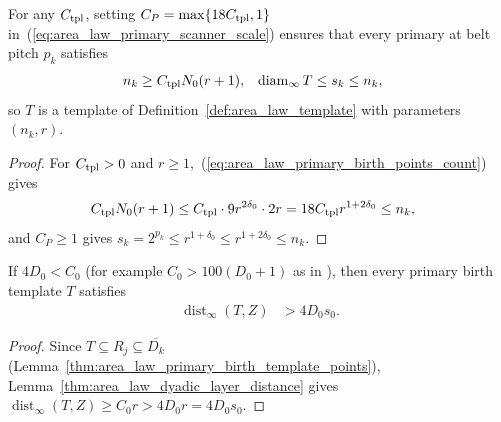 \begin{lemma}
    \label{thm:area_law_primary_scanner_constant}
    \leanok
    For any $C_{\rm tpl}$, setting $C_P=\max\{18C_{\rm tpl},1\}$ in~(\ref{eq:area_law_primary_scanner_scale})
    ensures that every primary at belt pitch $p_k$ satisfies
    \begin{align}
        n_k                          & \ge C_{\rm tpl}N_0(r+1), &
        \operatorname{diam}_\infty T & \le s_k\le n_k,
        \label{eq:area_law_primary_scanner_constant}
    \end{align}
    so $T$ is a template of Definition~\ref{def:area_law_template} with
    parameters $(n_k,r)$.
\end{lemma}
\begin{proof}\leanok
    For $C_{\rm tpl}>0$ and $r\ge1$,~(\ref{eq:area_law_primary_birth_points_count})
    gives
    \begin{align}
        C_{\rm tpl}N_0(r+1)
         & \le C_{\rm tpl}\cdot9r^{2\delta_0}\cdot2r
        =18C_{\rm tpl}r^{1+2\delta_0}\le n_k,
        \notag
    \end{align}
    and $C_P\ge1$ gives $s_k=2^{p_k}\le r^{1+\delta_0}\le r^{1+2\delta_0}\le n_k$.
\end{proof}

\begin{lemma}
    \label{thm:area_law_primary_birth_template_clearance}
    \leanok
    If $4D_0<C_0$ (for example $C_0>100(D_0+1)$ as in
    \cite[Section~11]{OpenAI2026AreaLaw}), then every primary birth template $T$
    satisfies
    \begin{align}
        \operatorname{dist}_\infty(T,Z) & >4D_0s_0.
        \label{eq:area_law_primary_birth_clearance}
    \end{align}
\end{lemma}
\begin{proof}\leanok
    Since $T\subseteq R_j\subseteq\overline{D_k}$
    (Lemma~\ref{thm:area_law_primary_birth_template_points}),
    Lemma~\ref{thm:area_law_dyadic_layer_distance} gives
    $\operatorname{dist}_\infty(T,Z)\ge C_0r>4D_0r=4D_0s_0$.
\end{proof}


